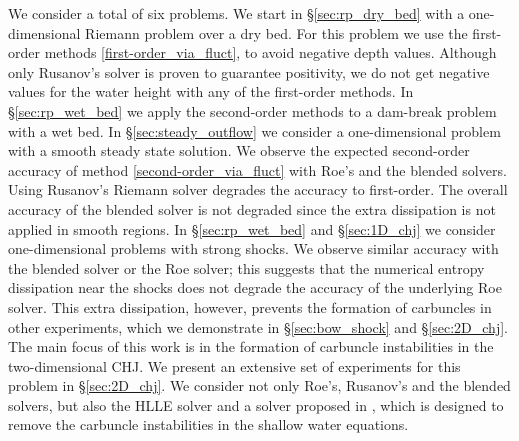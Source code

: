 \documentclass[preprint, 11pt]{article}
\begin{document}
We consider a total of six problems. We start in \S \ref{sec:rp_dry_bed} with a
one-dimensional Riemann problem over a dry bed.
For this problem we use the first-order methods \eqref{first-order_via_fluct},
to avoid negative depth values. Although only Rusanov's solver is proven to guarantee
positivity, we do not get negative values for the water height with any of the first-order methods.
In \S \ref{sec:rp_wet_bed} we apply the second-order methods to a dam-break problem
with a wet bed.
In \S \ref{sec:steady_outflow} we consider a one-dimensional problem with a smooth steady state solution. We observe the expected
second-order accuracy of method \eqref{second-order_via_fluct} with Roe's and the blended solvers. Using
Rusanov's Riemann solver degrades the accuracy to first-order. The overall accuracy of the blended solver
is not degraded since the extra dissipation is not applied in smooth regions.
In \S\ref{sec:rp_wet_bed} and \S\ref{sec:1D_chj} we consider one-dimensional problems with strong shocks. We observe similar accuracy with the
blended solver or the Roe solver; this suggests that the numerical entropy
dissipation near the shocks does not degrade the accuracy
of the underlying Roe solver. This extra dissipation, however, prevents the formation of carbuncles in other experiments,
which we demonstrate in \S \ref{sec:bow_shock} and \S\ref{sec:2D_chj}.
The main focus of this work is in the formation of carbuncle instabilities in the two-dimensional CHJ. We present
an extensive set of experiments for this problem in \S \ref{sec:2D_chj}.
We consider not only Roe's, Rusanov's and the blended solvers, but also the HLLE solver and a solver proposed in \cite{kemm2014note},
which is designed to remove the carbuncle instabilities in the shallow water equations.
\end{document}
